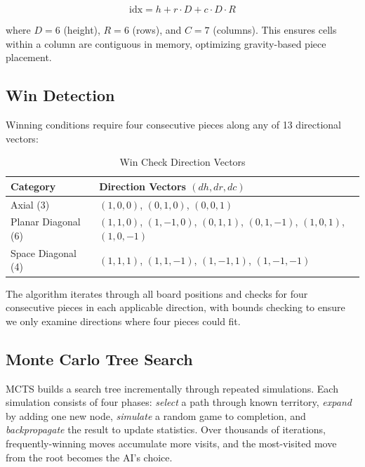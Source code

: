 \documentclass[11pt]{article}
\begin{document}
\begin{equation}
    \text{idx} = h + r \cdot D + c \cdot D \cdot R
\end{equation}

where $D = 6$ (height), $R = 6$ (rows), and $C = 7$ (columns). This ensures cells within a column are contiguous in memory, optimizing gravity-based piece placement.


\subsection{Win Detection}

Winning conditions require four consecutive pieces along any of 13 directional vectors:

\begin{table}[H]
\centering
\caption{Win Check Direction Vectors}
\begin{tabular}{ll}
\toprule
\textbf{Category} & \textbf{Direction Vectors $(dh, dr, dc)$} \\
\midrule
Axial (3) & $(1,0,0)$, $(0,1,0)$, $(0,0,1)$ \\
Planar Diagonal (6) & $(1,1,0)$, $(1,-1,0)$, $(0,1,1)$, $(0,1,-1)$, $(1,0,1)$, $(1,0,-1)$ \\
Space Diagonal (4) & $(1,1,1)$, $(1,1,-1)$, $(1,-1,1)$, $(1,-1,-1)$ \\
\bottomrule
\end{tabular}
\end{table}

The algorithm iterates through all board positions and checks for four consecutive pieces in each applicable direction, with bounds checking to ensure we only examine directions where four pieces could fit.

\subsection{Monte Carlo Tree Search}

MCTS builds a search tree incrementally through repeated simulations. Each simulation consists of four phases: \textit{select} a path through known territory, \textit{expand} by adding one new node, \textit{simulate} a random game to completion, and \textit{backpropagate} the result to update statistics. Over thousands of iterations, frequently-winning moves accumulate more visits, and the most-visited move from the root becomes the AI's choice.
\end{document}
